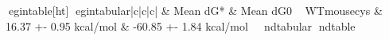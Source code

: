 egin{table}[ht]
egin{tabular}{|c|c|c|}
\hline
  & Mean dG* & Mean dG0 \
\hline
WTmousecys & 16.37 +- 0.95 kcal/mol & -60.85 +- 1.84 kcal/mol \
\hline
nd{tabular}
nd{table}
